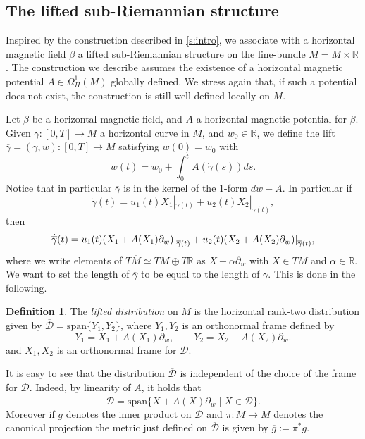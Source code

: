 \documentclass{amsart}
\theoremstyle{plain}
\theoremstyle{definition}
\newtheorem{definition}[thm]{Definition}
\theoremstyle{remark}
\newcommand{\R}{\mathbb{R}}
\newcommand{\p}{\partial}												%
\newcommand{\g}{\gamma}
\newcommand{\sr}{sub-{R}ie\-man\-nian }
\newcommand{\distr}{\mathcal{D}}								%
\newcommand{\B}{\beta}
\newcommand{\lift}[1]{\overline{#1}} 							%
\newcommand\restr[2]{{													%
  \left.\kern-\nulldelimiterspace 					
  #1 																			
  \right|_{#2} 														
  }}
\begin{document}
\subsection{The lifted sub-Riemannian structure}
Inspired by the construction described in \cref{s:intro},
we associate with a horizontal magnetic field $\B$ a lifted \sr structure on the line-bundle $ \lift M = M\times \R$. 
The construction we describe assumes the existence of a horizontal magnetic potential $A\in\Omega^1_H(M)$ globally defined. We stress again that, if such a potential does not exist, the construction is still-well defined locally on $M$.

\smallskip

Let $\B$ be a horizontal magnetic field, and $A$ a horizontal magnetic potential for $\B$.
Given $\g:[0,T]\to M$ a horizontal curve in $M$, and $w_{0}\in \R$, we define the lift $\lift{\g}=(\g,w):[0,T]\to \lift{M}$ satisfying $w(0)=w_{0}$ with
\begin{equation}
w(t)=w_{0}+\int_0^tA(\dot{\g}(s))ds.
\end{equation}
Notice that in particular $\dot{\lift{\g}}$ is in the kernel of the 1-form $dw-A$. In particular if
\begin{equation}
\dot{ \g}(t)=u_1(t)X_1|_{\g (t)}+u_2(t)X_2 |_{\g (t)},
\end{equation}
then
\begin{equation}
\dot{\lift \g}(t)=u_1(t)\restr{(X_1+A(X_1)\p_w)}{\lift \g (t)}+u_2(t)\restr{(X_2+A(X_2)\p_w)}{\lift \g (t)},
\end{equation}
where we write elements of $T\lift M\simeq TM\oplus T\R$ as $X+\alpha \p_w$ with $X\in TM$ and $\alpha \in \R$. We want to set the length of $\lift \g$ to be equal to the length of $\g$. This is done in the following.

\begin{definition}
The \emph{lifted distribution} on $\lift M$ is the horizontal $\mathrm{rank}$-two distribution given by $\lift \distr = \mathrm{span}\{Y_1,Y_2\}$, where $Y_1,Y_2$ is an orthonormal frame defined by
\begin{equation}
\label{eq:generatingfamily}
Y_1=X_1+A(X_1)\p_w, \qquad Y_2=X_2+A(X_2)\p_w.
\end{equation} 
and $X_{1},X_{2}$ is an orthonormal frame for $\distr$.
\end{definition}

It is easy to see that the distribution $\lift \distr$ is independent of the choice of the frame for $\distr$. Indeed, by linearity of $A$, it holds that $$\lift \distr = \mathrm{span}\{X+A(X)\p_w\mid X\in \distr\}.$$ Moreover if $g$ denotes the inner product on $\distr$ and $\pi:\lift M \to M$ denotes the canonical projection the metric just defined on $\lift \distr$ is given by  $\lift g:=\pi^{*}g$.
\end{document}
